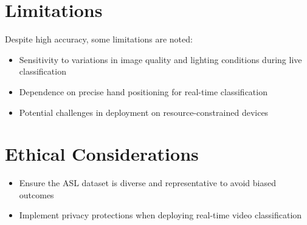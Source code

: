 \documentclass[12pt, a4paper]{article}
\begin{document}
\section{Limitations}
Despite high accuracy, some limitations are noted:
\begin{itemize}
    \item Sensitivity to variations in image quality and lighting conditions during live classification
    \item Dependence on precise hand positioning for real-time classification
    \item Potential challenges in deployment on resource-constrained devices
\end{itemize}

\section{Ethical Considerations}
\begin{itemize}
    \item Ensure the ASL dataset is diverse and representative to avoid biased outcomes
    \item Implement privacy protections when deploying real-time video classification
\end{itemize}


\end{document}
